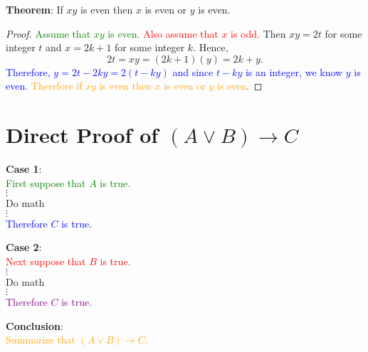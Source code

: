 \documentclass[11pt, oneside]{article}
\begin{document}
\noindent \textbf{Theorem}:      If $xy$ is even then $x$ is even or $y$ is even.
\begin{proof}\textcolor{green}{Assume that $xy$ is even.} \textcolor{red}{Also assume that $x$ is odd.} Then $xy=2t$ for some integer $t$ and $x=2k+1$ for some integer $k$. Hence, $$2t=xy=(2k+1)(y) = 2k+y.$$
\textcolor{blue}{Therefore, $y=2t-2ky=2(t-ky)$ and since $t-ky$ is an integer, we know $y$ is even}. \textcolor{orange}{Therefore if $xy$ is even then $x$ is even or $y$ is even}.
\end{proof}




		\newpage

\section{Direct Proof of $(A \vee B) \rightarrow C$}

		\begin{multicols}{2} 
		\begin{minipage}{2.5in}
		\begin{center}
 		\textbf{Case 1}:\\
		\textcolor{green}{First suppose that $A$ is true.}\\
 		$\vdots$ \\ Do math \\ $\vdots$ \\
 		\textcolor{blue}{Therefore $C$ is true}. \\[0.2in]
 		\end{center} \end{minipage}
 
  		\begin{minipage}{2.5in}
  		\begin{center}
 		\textbf{Case 2}:\\
		 \textcolor{red}{Next suppose that $B$ is true.}\\
		 $\vdots$ \\ Do math \\ $\vdots$ \\
		 \textcolor{purple}{Therefore $C$ is true.} \\[0.2in]
  		\end{center} \end{minipage} \end{multicols}
  		\begin{center} 
 		\textbf{Conclusion}: \\
		\textcolor{orange}{Summarize that $(A \vee B) \rightarrow C$.}\\[0.2in] 
		  \end{center} 
		  
\end{document}
